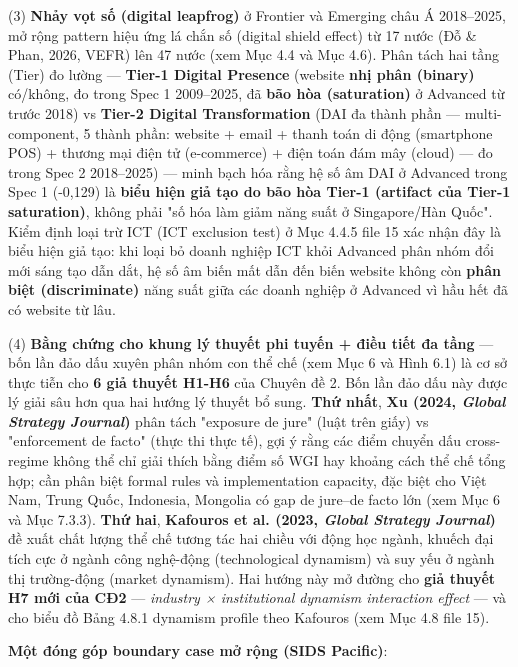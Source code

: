 \documentclass[12pt,a4paper]{article}
\begin{document}
(3) \textbf{Nhảy vọt số (digital leapfrog)} ở Frontier và Emerging châu
Á 2018--2025, mở rộng pattern hiệu ứng lá chắn số (digital shield
effect) từ 17 nước (Đỗ \& Phan, 2026, VEFR) lên 47 nước (xem Mục 4.4 và
Mục 4.6). Phân tách hai tầng (Tier) đo lường --- \textbf{Tier-1 Digital
Presence} (website \textbf{nhị phân (binary)} có/không, đo trong Spec 1
2009--2025, đã \textbf{bão hòa (saturation)} ở Advanced từ trước 2018)
vs \textbf{Tier-2 Digital Transformation} (DAI đa thành phần ---
multi-component, 5 thành phần: website + email + thanh toán di động
(smartphone POS) + thương mại điện tử (e-commerce) + điện toán đám mây
(cloud) --- đo trong Spec 2 2018--2025) --- minh bạch hóa rằng hệ số âm
DAI ở Advanced trong Spec 1 (-0,129) là \textbf{biểu hiện giả tạo do bão
hòa Tier-1 (artifact của Tier-1 saturation)}, không phải "số hóa làm
giảm năng suất ở Singapore/Hàn Quốc". Kiểm định loại trừ ICT (ICT
exclusion test) ở Mục 4.4.5 file 15 xác nhận đây là biểu hiện giả tạo:
khi loại bỏ doanh nghiệp ICT khỏi Advanced phân nhóm đổi mới sáng tạo
dẫn dắt, hệ số âm biến mất dẫn đến biến website không còn \textbf{phân
biệt (discriminate)} năng suất giữa các doanh nghiệp ở Advanced vì hầu
hết đã có website từ lâu.

(4) \textbf{Bằng chứng cho khung lý thuyết phi tuyến + điều tiết đa
tầng} --- bốn lần đảo dấu xuyên phân nhóm con thể chế (xem Mục 6 và Hình
6.1) là cơ sở thực tiễn cho \textbf{6 giả thuyết H1-H6} của Chuyên đề 2.
Bốn lần đảo dấu này được lý giải sâu hơn qua hai hướng lý thuyết bổ
sung. \textbf{Thứ nhất}, \textbf{Xu (2024, \emph{Global Strategy
Journal})} phân tách "exposure de jure" (luật trên giấy) vs "enforcement
de facto" (thực thi thực tế), gợi ý rằng các điểm chuyển dấu
cross-regime không thể chỉ giải thích bằng điểm số WGI hay khoảng cách
thể chế tổng hợp; cần phân biệt formal rules và implementation capacity,
đặc biệt cho Việt Nam, Trung Quốc, Indonesia, Mongolia có gap de
jure--de facto lớn (xem Mục 6 và Mục 7.3.3). \textbf{Thứ hai},
\textbf{Kafouros et al. (2023, \emph{Global Strategy Journal})} đề xuất
chất lượng thể chế tương tác hai chiều với động học ngành, khuếch đại
tích cực ở ngành công nghệ-động (technological dynamism) và suy yếu ở
ngành thị trường-động (market dynamism). Hai hướng này mở đường cho
\textbf{giả thuyết H7 mới của CĐ2} --- \emph{industry × institutional
dynamism interaction effect} --- và cho biểu đồ Bảng 4.8.1 dynamism
profile theo Kafouros (xem Mục 4.8 file 15).

\textbf{Một đóng góp boundary case mở rộng (SIDS Pacific)}:
\end{document}
